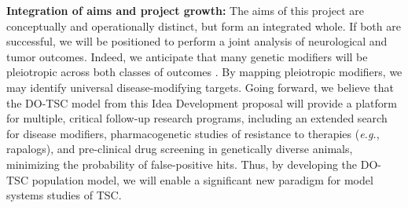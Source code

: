 \documentclass[
  12pt,
]{article}
\begin{document}
\textbf{Integration of aims and project growth:} The aims of this
project are conceptually and operationally distinct, but form an
integrated whole. If both are successful, we will be positioned to
perform a joint analysis of neurological and tumor outcomes. Indeed, we
anticipate that many genetic modifiers will be pleiotropic across both
classes of outcomes \cite{28592500}. By mapping pleiotropic modifiers,
we may identify universal disease-modifying targets. Going forward, we
believe that the DO-TSC model from this Idea Development proposal will
provide a platform for multiple, critical follow-up research programs,
including an extended search for disease modifiers, pharmacogenetic
studies of resistance to therapies (\textit{e.g.}, rapalogs), and
pre-clinical drug screening in genetically diverse animals, minimizing
the probability of false-positive hits. Thus, by developing the DO-TSC
population model, we will enable a significant new paradigm for model
systems studies of TSC.

\pagebreak


\end{document}
